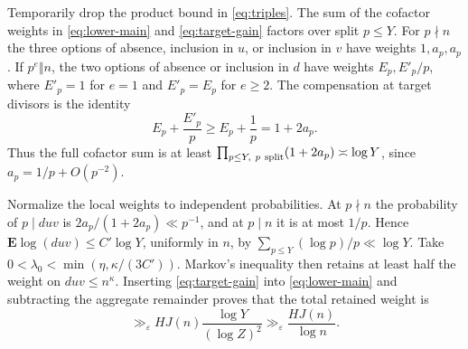 Temporarily drop the product bound in \eqref{eq:triples}.
The sum of the cofactor weights in \eqref{eq:lower-main}
and \eqref{eq:target-gain} factors over split \(p\le Y\).
For \(p\nmid n\) the three options of absence, inclusion in
\(u\), or inclusion in \(v\) have weights \(1,a_p,a_p\).
If \(p^e\Vert n\), the two options of absence or inclusion in
\(d\) have weights \(E_p,E'_p/p\), where \(E'_p=1\) for \(e=1\)
and \(E'_p=E_p\) for \(e\ge2\).
The compensation at target divisors is the identity
\[
 E_p+\frac{E'_p}{p}\ge E_p+\frac1p=1+2a_p .
\]
Thus the full cofactor sum is at least
\(\prod_{p\le Y,\ p\ {\rm split}}(1+2a_p)\asymp\log Y\),
since \(a_p=1/p+O(p^{-2})\).

Normalize the local weights to independent probabilities.
At \(p\nmid n\) the probability of \(p\mid duv\) is
\(2a_p/(1+2a_p)\ll p^{-1}\), and at \(p\mid n\) it is at most
\(1/p\). Hence \(\mathbf E\log(duv)\le C'\log Y\), uniformly
in \(n\), by \(\sum_{p\le Y}(\log p)/p\ll\log Y\).
Take \(0<\lambda_0<\min(\eta,\kappa/(3C'))\). Markov's inequality
then retains at least half the weight on \(duv\le n^\kappa\).
Inserting \eqref{eq:target-gain} into \eqref{eq:lower-main}
and subtracting the aggregate remainder proves that the total
retained weight is
\begin{equation}\label{eq:weight}
 \gg_\varepsilon H J(n)\frac{\log Y}{(\log Z)^2}
       \gg_\varepsilon \frac{HJ(n)}{\log n}.
\end{equation}
